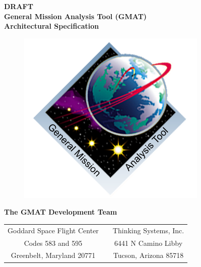 \thispagestyle{empty}
\begin{center}
{\renewcommand{\thefootnote}{\fnsymbol{footnote}} { \huge \bf DRAFT
\\General Mission Analysis Tool (GMAT)\\ Architectural Specification\\}
\vspace{0.1in} }
\end{center}

\begin{figure}[htbp!]
    \begin{center}
    \includegraphics[411,380]{../Common/Images/GMATsplash.png}
    \end{center}
\end{figure}

\begin{center}
{\Large \bf The GMAT Development Team}\\
\vspace{0.1in}
\begin{tabular}{c c c}
  Goddard Space Flight Center & & Thinking Systems, Inc. \\
  Codes 583 and 595 & \hspace{0.3in} & 6441 N Camino Libby \\
  Greenbelt, Maryland 20771 & & Tucson, Arizona 85718 \\
\end{tabular}

\vspace{0.1in}{\today}

\end{center}

\clearpage \clearpage
